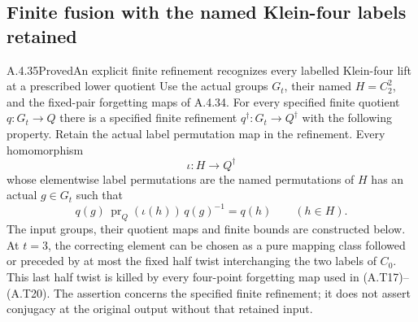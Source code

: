 \subsection{Finite fusion with the named Klein-four labels retained}

\begin{result}{A.4.35}{Proved}{An explicit finite refinement recognizes every labelled Klein-four lift at a prescribed lower quotient}
Use the actual groups $G_t$, their named $H=C_2^2$, and
the fixed-pair forgetting maps of A.4.34.
For every specified finite quotient $q:G_t\to Q$ there
is a specified finite refinement $q^\dagger:G_t\to Q^\dagger$
with the following property.  Retain the actual label
permutation map in the refinement.  Every homomorphism
\[
 \iota:H\longrightarrow Q^\dagger
\]
whose elementwise label permutations are the named
permutations of $H$ has an actual $g\in G_t$ such that
\[
 q(g)\,\operatorname{pr}_Q(\iota(h))\,q(g)^{-1}=q(h)
                    \qquad(h\in H).                    \tag{KFU.1}
\]
The input groups, their quotient maps and finite bounds
are constructed below.  At $t=3$, the correcting element
can be chosen as a pure mapping class followed or preceded
by at most the fixed half twist interchanging the two
labels of $C_0$.  This last half twist is killed by every
four-point forgetting map used in (A.T17)--(A.T20).
The assertion concerns the specified finite refinement;
it does not assert conjugacy at the original output
without that retained input.
\end{result}

